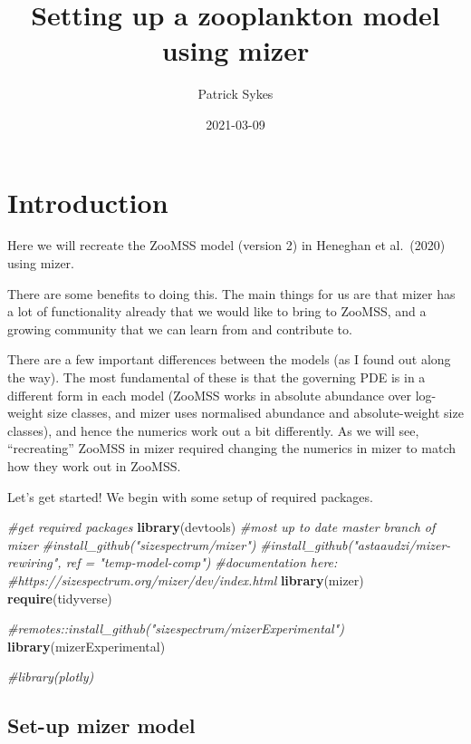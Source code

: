 \documentclass[
]{article}
\title{Setting up a zooplankton model using mizer}
\author{Patrick Sykes}
\date{2021-03-09}
\newenvironment{Shaded}{\begin{snugshade}}{\end{snugshade}}
\newcommand{\CommentTok}[1]{\textcolor[rgb]{0.56,0.35,0.01}{\textit{#1}}}
\newcommand{\KeywordTok}[1]{\textcolor[rgb]{0.13,0.29,0.53}{\textbf{#1}}}
\newcommand{\NormalTok}[1]{#1}
\begin{document}
\maketitle

\hypertarget{introduction}{%
\section{Introduction}\label{introduction}}

Here we will recreate the ZooMSS model (version 2) in Heneghan et
al.~(2020) using mizer.

There are some benefits to doing this. The main things for us are that
mizer has a lot of functionality already that we would like to bring to
ZooMSS, and a growing community that we can learn from and contribute
to.

There are a few important differences between the models (as I found out
along the way). The most fundamental of these is that the governing PDE
is in a different form in each model (ZooMSS works in absolute abundance
over log-weight size classes, and mizer uses normalised abundance and
absolute-weight size classes), and hence the numerics work out a bit
differently. As we will see, ``recreating'' ZooMSS in mizer required
changing the numerics in mizer to match how they work out in ZooMSS.

Let's get started! We begin with some setup of required packages.

\begin{Shaded}
\begin{Highlighting}[]
\CommentTok{#get required packages}
\KeywordTok{library}\NormalTok{(devtools)}
\CommentTok{#most up to date master branch of mizer}
\CommentTok{#install_github("sizespectrum/mizer")}
\CommentTok{#install_github("astaaudzi/mizer-rewiring", ref = "temp-model-comp")}
\CommentTok{#documentation here:}
\CommentTok{#https://sizespectrum.org/mizer/dev/index.html}
\KeywordTok{library}\NormalTok{(mizer)}
\KeywordTok{require}\NormalTok{(tidyverse)}

\CommentTok{#remotes::install_github("sizespectrum/mizerExperimental")}
\KeywordTok{library}\NormalTok{(mizerExperimental)}

\CommentTok{#library(plotly)}
\end{Highlighting}
\end{Shaded}

\hypertarget{set-up-mizer-model}{%
\subsection{Set-up mizer model}\label{set-up-mizer-model}}
\end{document}
